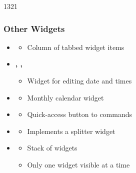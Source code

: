  \begin{slide}{1321}\frametitle{Other Widgets}
   \begin{itemize}
   \item  \textbf{}
     \begin{itemize}
     \item Column of tabbed widget items
     \end{itemize}
   \item \textbf{, , }
     \begin{itemize}
     \item Widget for editing date and times
     \end{itemize}
   \item \textbf{}
     \begin{itemize}
     \item Monthly calendar widget
     \end{itemize}
   \item  \textbf{}
     \begin{itemize}
     \item Quick-access button to commands
     \end{itemize}
   \item \textbf{}
     \begin{itemize}
     \item Implements a splitter widget
     \end{itemize}
   \item \textbf{}
     \begin{itemize}
     \item Stack of widgets
     \item Only one widget visible at a time
     \end{itemize}
 \end{itemize}
\end{slide}
